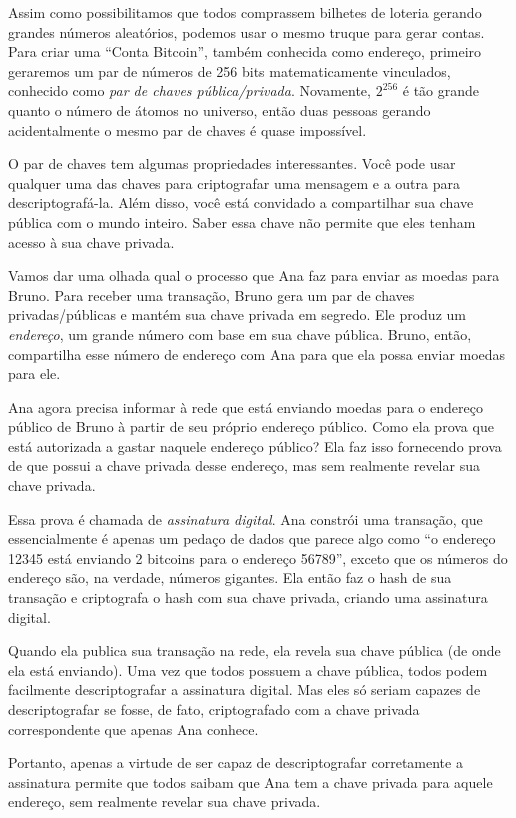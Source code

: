 Assim como possibilitamos que todos comprassem bilhetes de loteria gerando grandes números aleatórios, podemos usar o mesmo truque para gerar contas. Para criar uma “Conta Bitcoin”, também conhecida como endereço, primeiro geraremos um par de números de 256 bits matematicamente vinculados, conhecido como \textit{par de chaves pública/privada}. Novamente, \(2^{256}\) é tão grande quanto o número de átomos no universo, então duas pessoas gerando acidentalmente o mesmo par de chaves é quase impossível.

O par de chaves tem algumas propriedades interessantes. Você pode usar qualquer uma das chaves para criptografar uma mensagem e a outra para descriptografá-la. Além disso, você está convidado a compartilhar sua chave pública com o mundo inteiro. Saber essa chave não permite que eles tenham acesso à sua chave privada.

Vamos dar uma olhada qual o processo que Ana faz para enviar as moedas para Bruno. Para receber uma transação, Bruno gera um par de chaves privadas/públicas e mantém sua chave privada em segredo. Ele produz um \textit{endereço}, um grande número com base em sua chave pública. Bruno, então, compartilha esse número de endereço com Ana para que ela possa enviar moedas para ele.

Ana agora precisa informar à rede que está enviando moedas para o endereço público de Bruno à partir de seu próprio endereço público. Como ela prova que está autorizada a gastar naquele endereço público? Ela faz isso fornecendo prova de que possui a chave privada desse endereço, mas sem realmente revelar sua chave privada.

Essa prova é chamada de \textit{assinatura digital}. Ana constrói uma transação, que essencialmente é apenas um pedaço de dados que parece algo como “o endereço 12345 está enviando 2 bitcoins para o endereço 56789”, exceto que os números do endereço são, na verdade, números gigantes. Ela então faz o hash de sua transação e criptografa o hash com sua chave privada, criando uma assinatura digital.

Quando ela publica sua transação na rede, ela revela sua chave pública (de onde ela está enviando). Uma vez que todos possuem a chave pública, todos podem facilmente descriptografar a assinatura digital. Mas eles só seriam capazes de descriptografar se fosse, de fato, criptografado com a chave privada correspondente que apenas Ana conhece.

Portanto, apenas a virtude de ser capaz de descriptografar corretamente a assinatura permite que todos saibam que Ana tem a chave privada para aquele endereço, sem realmente revelar sua chave privada.

